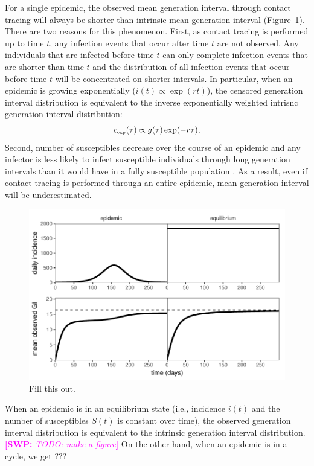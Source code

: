 \documentclass{article}
\newcommand{\tsub}[2]{#1_{{\textrm{\tiny #2}}}}
\newcommand{\comment}[3]{\textcolor{#1}{\textbf{[#2: }\textsl{#3}\textbf{]}}}
\newcommand{\swp}[1]{\comment{magenta}{SWP}{#1}}
\begin{document}
For a single epidemic, the observed mean generation interval through contact tracing will always be shorter than intrinsic mean generation interval (Figure~\ref{fig:censor}).
There are two reasons for this phenomenon.
First, as contact tracing is performed up to time $t$, any infection events that occur after time $t$ are not observed.
Any individuals that are infected before time $t$ can only complete infection events that are shorter than time $t$ and the distribution of all infection events that occur before time $t$ will be concentrated on shorter intervals.
In particular, when an epidemic is growing exponentially ($i(t) \propto \exp(rt)$), the censored generation interval distribution is equivalent to the inverse exponentially weighted intrisnc generation interval distribution:
\begin{equation}
\tsub{c}{exp}(\tau) \propto g(\tau) \exp(-r\tau),
\end{equation}
Second, number of susceptibles decrease over the course of an epidemic and any infector is less likely to infect susceptible individuals through long generation intervals than it would have in a fully susceptible population \citep{champredon2015intrinsic}.
As a result, even if contact tracing is performed through an entire epidemic, mean generation interval will be underestimated.

\begin{figure}
\includegraphics[width=\textwidth]{../analysis/temporal_effect.pdf}
\caption{Fill this out.}
\label{fig:censor}
\end{figure}

When an epidemic is in an equilibrium state (i.e., incidence $i(t)$ and the number of susceptibles $S(t)$ is constant over time), the observed generation interval distribution is equivalent to the intrinsic generation interval distribution. \swp{TODO: make a figure}
On the other hand, when an epidemic is in a cycle, we get ???
\end{document}
